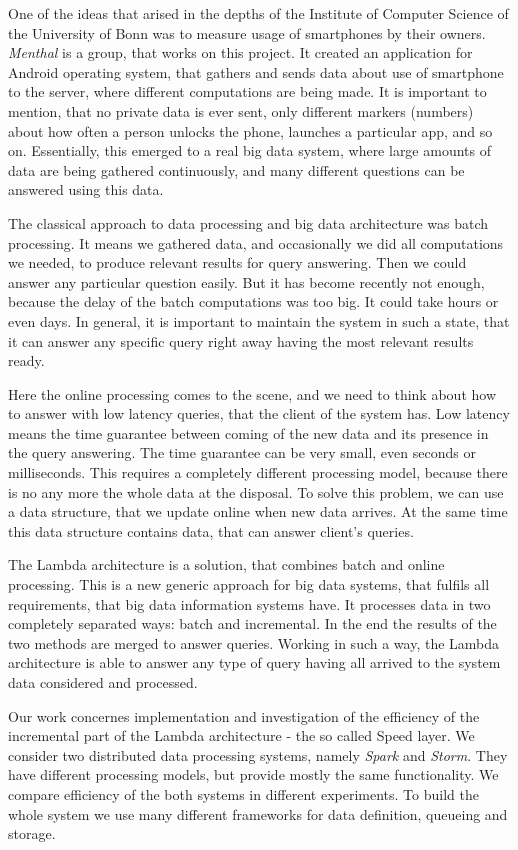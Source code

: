 One of the ideas that arised in the depths of the Institute of Computer Science of the University of Bonn was to measure usage of smartphones by their owners.
\textit{Menthal} is a group, that works on this project.
It created an application for Android operating system, that gathers and sends data about use of smartphone to the server, where different computations are being made.
It is important to mention, that no private data is ever sent, only different markers (numbers) about how often a person unlocks the phone, launches a particular app, and so on.
Essentially, this emerged to a real big data system, where large amounts of data are being gathered continuously, and many different questions can be answered using this data.

The classical approach to data processing and big data architecture was batch processing.
It means we gathered data, and occasionally we did all computations we needed, to produce relevant results for query answering.
Then we could answer any particular question easily.
But it has become recently not enough, because the delay of the batch computations was too big.
It could take hours or even days.
In general, it is important to maintain the system in such a state, that it can answer any specific query right away having the most relevant results ready.

Here the online processing comes to the scene, and we need to think about how to answer with low latency queries, that the client of the system has.
Low latency means the time guarantee between coming of the new data and its presence in the query answering.
The time guarantee can be very small, even seconds or milliseconds.
This requires a completely different processing model, because there is no any more the whole data at the disposal.
To solve this problem, we can use a data structure, that we update online when new data arrives.
At the same time this data structure contains data, that can answer client's queries.

The Lambda architecture is a solution, that combines batch and online processing.
This is a new generic approach for big data systems, that fulfils all requirements, that big data information systems have.
It processes data in two completely separated ways: batch and incremental.
In the end the results of the two methods are merged to answer queries.
Working in such a way, the Lambda architecture is able to answer any type of query having all arrived to the system data considered and processed.

Our work concernes implementation and investigation of the efficiency of the incremental part of the Lambda architecture - the so called Speed layer.
We consider two distributed data processing systems, namely \textit{Spark} and \textit{Storm}.
They have different processing models, but provide mostly the same functionality.
We compare efficiency of the both systems in different experiments.
To build the whole system we use many different frameworks for data definition, queueing and storage.

